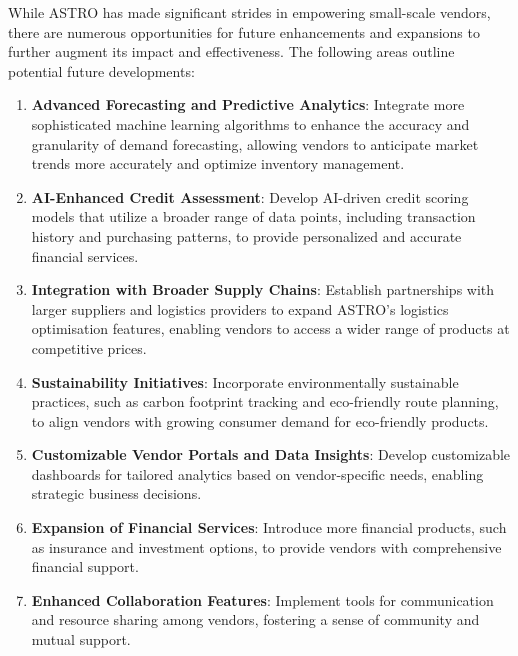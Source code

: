 While ASTRO has made significant strides in empowering small-scale vendors, there are numerous opportunities for future enhancements and expansions to further augment its impact and effectiveness. The following areas outline potential future developments:

\begin{enumerate}
    \item \textbf{Advanced Forecasting and Predictive Analytics}: Integrate more sophisticated machine learning algorithms to enhance the accuracy and granularity of demand forecasting, allowing vendors to anticipate market trends more accurately and optimize inventory management.
    \item \textbf{AI-Enhanced Credit Assessment}: Develop AI-driven credit scoring models that utilize a broader range of data points, including transaction history and purchasing patterns, to provide personalized and accurate financial services.
    \item \textbf{Integration with Broader Supply Chains}: Establish partnerships with larger suppliers and logistics providers to expand ASTRO’s logistics optimisation features, enabling vendors to access a wider range of products at competitive prices.
    \item \textbf{Sustainability Initiatives}: Incorporate environmentally sustainable practices\cite{wang2018greenrouting}, such as carbon footprint tracking and eco-friendly route planning, to align vendors with growing consumer demand for eco-friendly products.
    \item \textbf{Customizable Vendor Portals and Data Insights}: Develop customizable dashboards for tailored analytics based on vendor-specific needs, enabling strategic business decisions.
    \item \textbf{Expansion of Financial Services}: Introduce more financial products, such as insurance and investment options, to provide vendors with comprehensive financial support.
    \item \textbf{Enhanced Collaboration Features}: Implement tools for communication and resource sharing among vendors, fostering a sense of community and mutual support.


\end{enumerate}
